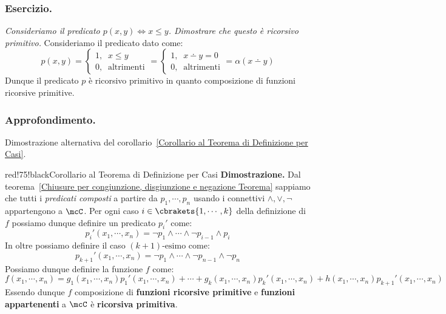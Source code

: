 \subsubsection*{Esercizio.} \textit{Consideriamo il predicato \(p(x,y)\iff x\leq y\). Dimostrare che questo è ricorsivo primitivo.}
Consideriamo il predicato dato come:
\begin{equation}
    p(x,y)=\begin{cases}
        1, \;\; x\leq y\\
        0, \;\; \text{altrimenti}
    \end{cases} = \begin{cases}
        1, \;\; x\dotminus y = 0\\
        0, \;\; \text{altrimenti}
    \end{cases} = \alpha(x\dotminus y)
    \label{Predicato Minore Uguale Eq}
\end{equation}
Dunque il predicato \(p\) è ricorsivo primitivo in quanto composizione di funzioni ricorsive primitive.

\subsubsection*{Approfondimento.} Dimostrazione alternativa del corollario~\ref{Corollario al Teorema di Definizione per Casi}.

\begin{halfframedbox}{red!75!black}{Corollario al Teorema di Definizione per Casi}\label{Corollario al Teorema di Definizione per Casi AltDim}
    \textbf{Dimostrazione. } Dal teorema~\ref{Chiusure per congiunzione, disgiunzione e negazione Teorema} sappiamo che tutti i \textit{predicati composti} a partire da \(p_1,\cdots,p_n\) usando i connettivi \(\land,\lor,\neg\) appartengono a \(\mcC\).
  Per ogni caso \(i\in \cbrakets{1,\cdots,k}\) della definizione di \(f\) possiamo dunque definire un predicato \(p_i'\) come:
  \begin{equation}
    p_i'(x_1,\cdots,x_n)=\neg p_1 \land \cdots \land \neg p_{i-1} \land p_i
  \end{equation}
  In oltre possiamo definire il caso \((k+1)\text{-esimo}\) come:
  \begin{equation}
    p_{k+1}'(x_1,\cdots,x_n)=\neg p_1 \land \cdots \land \neg p_{n-1} \land \neg p_n
  \end{equation}
  Possiamo dunque definire la funzione \(f\) come:
  \begin{equation}
    f(x_1,\cdots,x_n)=g_1(x_1,\cdots,x_n)p_1'(x_1,\cdots,x_n)+\cdots+g_k(x_1,\cdots,x_n)p_k'(x_1,\cdots,x_n)+h(x_1,\cdots,x_n)p_{k+1}'(x_1,\cdots,x_n)
  \end{equation}
  Essendo dunque \(f\) composizione di \textbf{funzioni ricorsive primitive} e \textbf{funzioni appartenenti} a \(\mcC\) è \textbf{ricorsiva primitiva}.
\end{halfframedbox}


